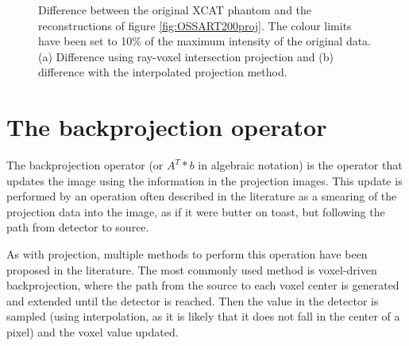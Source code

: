 \begin{figure}
\centering
{}

\caption[Difference in reconstruction using different projection operators]{\label{fig:OSSART200projdiff} Difference between the original XCAT phantom and the reconstructions of figure \ref{fig:OSSART200proj}. The colour limits have been set to 10\% of the maximum intensity of the original data.  (a) Difference using ray-voxel intersection projection and (b) difference with the interpolated projection method.} 
\end{figure}



\FloatBarrier

\section{The backprojection operator}

The backprojection operator (or $A^T*b$ in algebraic notation) is the operator that updates the image using the information in the projection images. This update is performed by an operation often described in the literature as a smearing of the projection data into the image, as if it were butter on toast, but following the path from detector to source.

As with projection, multiple methods to perform this operation have been proposed in the literature. The most commonly used method is voxel-driven backprojection\cite{scherl2007fast}\cite{okitsu2010high}, where the path from the source to each voxel center is generated and extended until the detector is reached. Then the value in the detector is sampled (using interpolation, as it is likely that it does not fall in the center of a pixel) and the voxel value updated.
 
